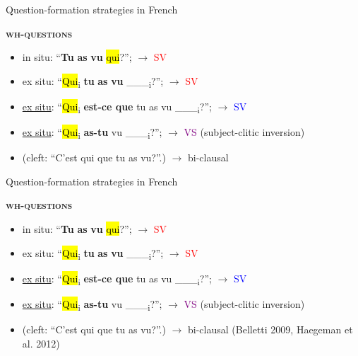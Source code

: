 \documentclass[lesson_slides]{subfiles}
\begin{document}
\begin{frame}[c]{Question-formation strategies in French}

    \noindent \textbf{\textsc{wh-questions}}
    \begin{itemize}
        \item[\ding{227}] in situ: “\textbf{Tu} \textbf{as} \textbf{vu} \hl{qui}?”; $\longrightarrow$ \textcolor{red}{SV}
        \item[\ding{227}] ex situ: “\hl{Qui}\textsubscript{i} \textbf{tu} \textbf{as} \textbf{vu} \_\_\_\textsubscript{i}?”;  $\longrightarrow$ \textcolor{red}{SV}
        \item[\ding{227}] \underline{ex situ}: “\hl{Qui}\textsubscript{i} \textbf{est-ce que} tu as vu \_\_\_\textsubscript{i}?”; $\longrightarrow$ \textcolor{blue}{SV}
        \item[\ding{227}] \underline{ex situ}: “\hl{Qui}\textsubscript{i} \textbf{as-tu} vu \_\_\_\textsubscript{i}?”; $\longrightarrow$ \textcolor{purple}{VS} (subject-clitic inversion)
        \item[\ding{227}] (cleft: “C’est qui que tu as vu?”.) $\longrightarrow$ bi-clausal
    \end{itemize}
   
\end{frame}
\begin{frame}[c]{Question-formation strategies in French}

    \noindent \textbf{\textsc{wh-questions}}
    \begin{itemize}
        \item[\ding{227}] in situ: “\textbf{Tu} \textbf{as} \textbf{vu} \hl{qui}?”; $\longrightarrow$ \textcolor{red}{SV}
        \item[\ding{227}] ex situ: “\hl{Qui}\textsubscript{i} \textbf{tu} \textbf{as} \textbf{vu} \_\_\_\textsubscript{i}?”;  $\longrightarrow$ \textcolor{red}{SV}
        \item[\ding{227}] \underline{ex situ}: “\hl{Qui}\textsubscript{i} \textbf{est-ce que} tu as vu \_\_\_\textsubscript{i}?”; $\longrightarrow$ \textcolor{blue}{SV}
        \item[\ding{227}] \underline{ex situ}: “\hl{Qui}\textsubscript{i} \textbf{as-tu} vu \_\_\_\textsubscript{i}?”; $\longrightarrow$ \textcolor{purple}{VS} (subject-clitic inversion)
        \item[\ding{227}] (cleft: “C’est qui que tu as vu?”.) $\longrightarrow$ bi-clausal (Belletti 2009, Haegeman et al. 2012)
    \end{itemize}
   
\end{frame}
\end{document}

